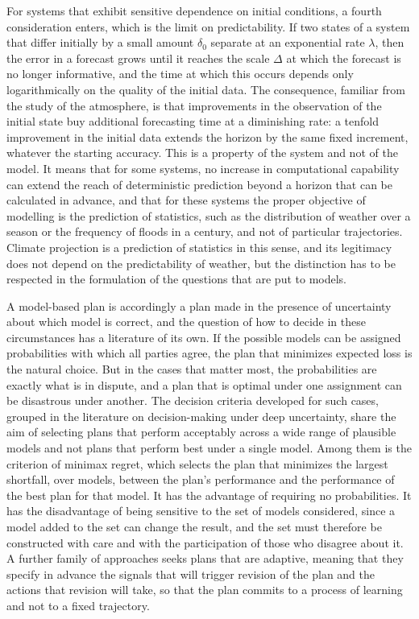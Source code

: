 For systems that exhibit sensitive dependence on initial conditions, a fourth consideration enters, which is the limit on predictability. If two states of a system that differ initially by a small amount $\delta_0$ separate at an exponential rate $\lambda$, then the error in a forecast grows until it reaches the scale $\Delta$ at which the forecast is no longer informative, and the time at which this occurs depends only logarithmically on the quality of the initial data. The consequence, familiar from the study of the atmosphere, is that improvements in the observation of the initial state buy additional forecasting time at a diminishing rate: a tenfold improvement in the initial data extends the horizon by the same fixed increment, whatever the starting accuracy. This is a property of the system and not of the model. It means that for some systems, no increase in computational capability can extend the reach of deterministic prediction beyond a horizon that can be calculated in advance, and that for these systems the proper objective of modelling is the prediction of statistics, such as the distribution of weather over a season or the frequency of floods in a century, and not of particular trajectories. Climate projection is a prediction of statistics in this sense, and its legitimacy does not depend on the predictability of weather, but the distinction has to be respected in the formulation of the questions that are put to models.

A model-based plan is accordingly a plan made in the presence of uncertainty about which model is correct, and the question of how to decide in these circumstances has a literature of its own. If the possible models can be assigned probabilities with which all parties agree, the plan that minimizes expected loss is the natural choice. But in the cases that matter most, the probabilities are exactly what is in dispute, and a plan that is optimal under one assignment can be disastrous under another. The decision criteria developed for such cases, grouped in the literature on decision-making under deep uncertainty, share the aim of selecting plans that perform acceptably across a wide range of plausible models and not plans that perform best under a single model. Among them is the criterion of minimax regret, which selects the plan that minimizes the largest shortfall, over models, between the plan's performance and the performance of the best plan for that model. It has the advantage of requiring no probabilities. It has the disadvantage of being sensitive to the set of models considered, since a model added to the set can change the result, and the set must therefore be constructed with care and with the participation of those who disagree about it. A further family of approaches seeks plans that are adaptive, meaning that they specify in advance the signals that will trigger revision of the plan and the actions that revision will take, so that the plan commits to a process of learning and not to a fixed trajectory.

